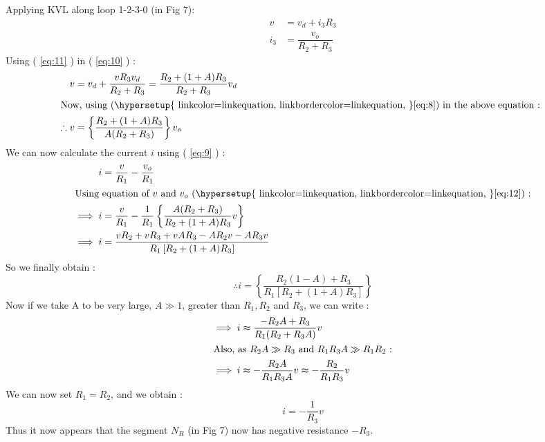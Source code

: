 \documentclass[12pt]{article}
\newcommand*{\myref}[1]{%
  \begingroup
    \hypersetup{
      linkcolor=linkequation,
      linkbordercolor=linkequation,
    }%
    \ref{#1}%
  \endgroup
}
\begin{document}
Applying KVL along loop 1-2-3-0 (in Fig 7):
\begin{align}
	v&=v_d + i_3R_3 \label{eq:10} \\
	i_3&=\dfrac{v_o}{R_2+R_3} \label{eq:11}
\end{align}
Using (\myref{eq:11}) in (\myref{eq:10}) :
\begin{align}
	v&=v_d + \dfrac{v R_3 v_d}{R_2+R_3} = \dfrac{R_2+(1+A)R_3}{R_2+R_3}v_d \nonumber \\
	\intertext{Now, using (\myref{eq:8}) in the above equation : }
	\therefore v&= \left\{ \dfrac{R_2+(1+A)R_3}{A(R_2+R_3)} \right\}v_o \label{eq:12}
\end{align}
We can now calculate the current $i$ using (\myref{eq:9}) :
\begin{align*}
	i&=\dfrac{v}{R_1}-\dfrac{v_o}{R_1} \\
	\intertext{Using equation of $v$ and $v_o$ (\myref{eq:12}) :}
	\implies i &= \dfrac{v}{R_1}-\dfrac{1}{R_1}\left\{ \dfrac{A(R_2+R_3)}{R_2+(1+A)R_3}v \right\} \\
	\implies i &= \dfrac{vR_2+vR_3+vAR_3-AR_2v-AR_3v}{R_1\left[ R_2+(1+A)R_3 \right]}
\end{align*}
So we finally obtain :
\begin{equation}
	\therefore i = \left\{ \dfrac{R_2(1-A)+R_3}{R_1\left[ R_2+(1+A)R_3 \right] } \right\} \label{eq:13}
\end{equation}
Now if we take A to be very large, $A\gg 1$, greater than $R_1, R_2$ and $R_3$, we can write :
\begin{align*}
	\implies i & \thickapprox \dfrac{-R_2A+R_3}{R_1(R_2+R_3A)}v \\
	\intertext{Also, as $R_2A \gg R_3$ and $R_1R_3A \gg R_1R_2$ :}
	\implies i & \thickapprox -\dfrac{R_2A}{R_1R_3A}v \thickapprox -\dfrac{R_2}{R_1R_3}v
\end{align*}
We can now set $R_1=R_2$, and we obtain :
\begin{equation}
	i=-\dfrac{1}{R_3}v \label{eq:14}
\end{equation}
Thus it now appears that the segment $N_R$ (in Fig 7) now has negative resistance $-R_3$. 
%
\end{document}

